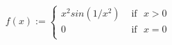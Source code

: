 \documentclass[preview]{standalone}
\begin{document}
\begin{align*}
f(x) := \begin{cases}x^{2}sin(1/x^{2})  &  \text{ if} \ \ \  x > 0 \\0 &  \text{ if} \ \ \ x=0 \\\end{cases}
\end{align*}
\end{document}

